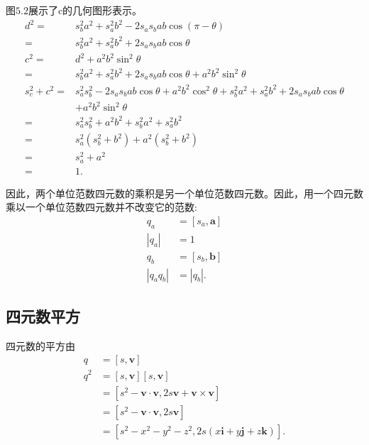 图$5.2$展示了c的几何图形表示。
$$
\begin{aligned}
d^{2}= & s_{b}^{2} a^{2}+s_{a}^{2} b^{2}-2 s_{a} s_{b} a b \cos (\pi-\theta) \\
= & s_{b}^{2} a^{2}+s_{a}^{2} b^{2}+2 s_{a} s_{b} a b \cos \theta \\
c^{2}= & d^{2}+a^{2} b^{2} \sin ^{2} \theta \\
= & s_{b}^{2} a^{2}+s_{a}^{2} b^{2}+2 s_{a} s_{b} a b \cos \theta+a^{2} b^{2} \sin ^{2} \theta \\
s_{c}^{2}+c^{2}= & s_{a}^{2} s_{b}^{2}-2 s_{a} s_{b} a b \cos \theta+a^{2} b^{2} \cos ^{2} \theta+s_{b}^{2} a^{2}+s_{a}^{2} b^{2}+2 s_{a} s_{b} a b \cos \theta \\
& +a^{2} b^{2} \sin ^{2} \theta \\
= & s_{a}^{2} s_{b}^{2}+a^{2} b^{2}+s_{b}^{2} a^{2}+s_{a}^{2} b^{2} \\
= & s_{a}^{2}\left(s_{b}^{2}+b^{2}\right)+a^{2}\left(s_{b}^{2}+b^{2}\right) \\
= & s_{a}^{2}+a^{2} \\
= & 1 .
\end{aligned}
$$

因此，两个单位范数四元数的乘积是另一个单位范数四元数。因此，用一个四元数乘以一个单位范数四元数并不改变它的范数:
$$
\begin{aligned}
q_{a} & =\left[s_{a}, \mathbf{a}\right] \\
\left|q_{a}\right| & =1 \\
q_{b} & =\left[s_{b}, \mathbf{b}\right] \\
\left|q_{a} q_{b}\right| & =\left|q_{b}\right| .
\end{aligned}
$$

\subsection{四元数平方}
四元数的平方由
$$
\begin{aligned}
q & =[s, \mathbf{v}] \\
q^{2} & =[s, \mathbf{v}][s, \mathbf{v}] \\
& =\left[s^{2}-\mathbf{v} \cdot \mathbf{v}, 2 s \mathbf{v}+\mathbf{v} \times \mathbf{v}\right] \\
& =\left[s^{2}-\mathbf{v} \cdot \mathbf{v}, 2 s \mathbf{v}\right] \\
& =\left[s^{2}-x^{2}-y^{2}-z^{2}, 2 s(x \mathbf{i}+y \mathbf{j}+z \mathbf{k})\right] .
\end{aligned}
$$

